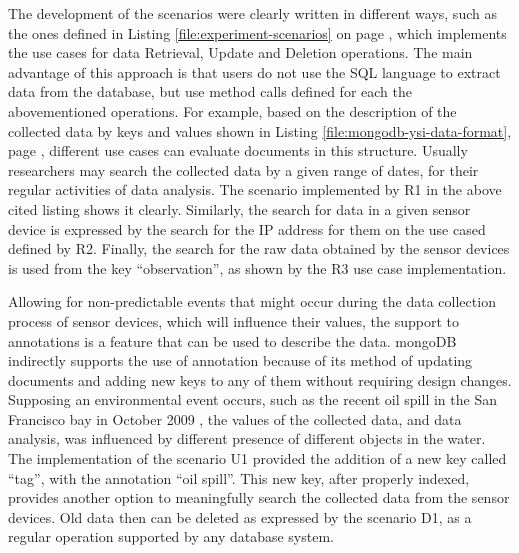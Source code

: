 The development of the scenarios were clearly written in different ways, such
as the ones defined in Listing \ref{file:experiment-scenarios} on page
\pageref{file:experiment-scenarios}, which implements the use cases for data
Retrieval, Update and Deletion operations. The main advantage of this approach
is that users do not use the SQL language to extract data from the database,
but use method calls defined for each the abovementioned operations. For
example, based on the description of the collected data by keys and values
shown in Listing \ref{file:mongodb-ysi-data-format}, page
\pageref{file:mongodb-ysi-data-format}, different use cases can evaluate
documents in this structure. Usually researchers may search the collected data
by a given range of dates, for their regular activities of data analysis. The
scenario implemented by R1 in the above cited listing shows it clearly.
Similarly, the search for data in a given sensor device is expressed by the
search for the IP address for them on the use cased defined by R2. Finally,
the search for the raw data obtained by the sensor devices is used from the
key ``observation'', as shown by the R3 use case implementation.

Allowing for non-predictable events that might occur during the data
collection process of sensor devices, which will influence their values, the
support to annotations is a feature that can be used to describe the data.
mongoDB indirectly supports the use of annotation because of its method
of updating documents and adding new keys to any of them without requiring
design changes. Supposing an environmental event occurs, such as the recent oil
spill in the San Francisco bay in October 2009 \cite{sfbay-oilspill2009}, the
values of the collected data, and data analysis, was influenced by different
presence of different objects in the water. The implementation of the scenario
U1 provided the addition of a new key called ``tag'', with the annotation ``oil
spill''. This new key, after properly indexed, provides another option to
meaningfully search the collected data from the sensor devices. Old data then
can be deleted as expressed by the scenario D1, as a regular operation
supported by any database system.

